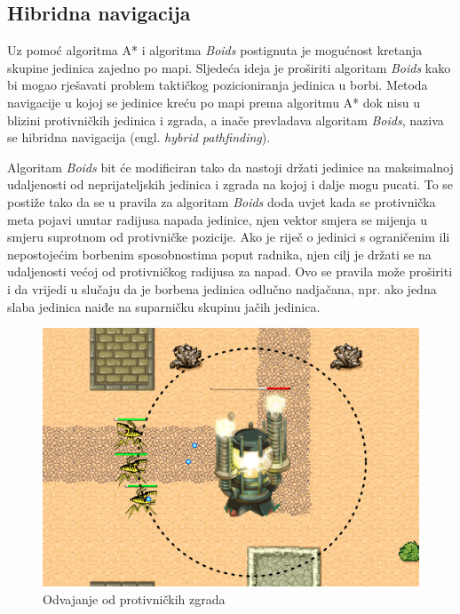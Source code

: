 \documentclass[times, utf8, zavrsni, numeric]{fer}
\begin{document}
\subsection{Hibridna navigacija}

\par Uz pomoć algoritma A* i algoritma \textit{Boids} postignuta je mogućnost kretanja skupine jedinica zajedno po mapi.
Sljedeća ideja je proširiti algoritam \textit{Boids} kako bi mogao rješavati problem taktičkog pozicioniranja jedinica u borbi.
Metoda navigacije u kojoj se jedinice kreću po mapi prema algoritmu A* dok nisu u blizini protivničkih jedinica i zgrada, a inače prevladava algoritam \textit{Boids}, naziva se hibridna navigacija (engl. \textit{hybrid pathfinding})\cite{article:HybridPathdinding}.

\par Algoritam \textit{Boids} bit će modificiran tako da nastoji držati jedinice na maksimalnoj udaljenosti od neprijateljskih jedinica i zgrada na kojoj i dalje mogu pucati.
To se postiže tako da se u pravila za algoritam \textit{Boids} doda uvjet kada se protivnička meta pojavi unutar radijusa napada jedinice, njen vektor smjera se mijenja u smjeru suprotnom od protivničke pozicije.
Ako je riječ o jedinici s ograničenim ili nepostojećim borbenim sposobnostima poput radnika, njen cilj je držati se na udaljenosti većoj od protivničkog radijusa za napad.
Ovo se pravila može proširiti i da vrijedi u slučaju da je borbena jedinica odlučno nadjačana, npr. ako jedna slaba jedinica naiđe na suparničku skupinu jačih jedinica.

\begin{figure}[h]
	\centering
	\includegraphics[width=0.8\linewidth]{images/boidsEnemySeparation.pdf}
	\caption{Odvajanje od protivničkih zgrada}
	\label{fig:boidsEnemySeparation}
\end{figure}
\end{document}
